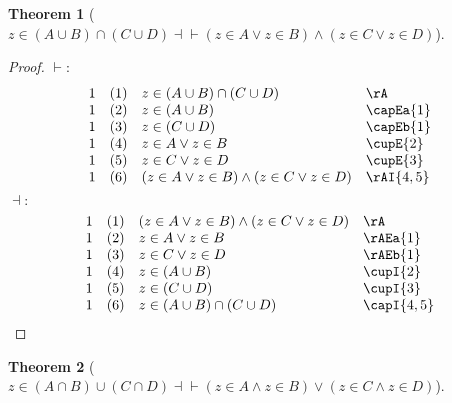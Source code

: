 \documentclass{book}
\theoremstyle{plain}
\newtheorem{theorem}{Theorem}
\theoremstyle{remark}
\theoremstyle{definition}
\begin{document}
\label{zInLpAcuBRpcaLpCcuDRpEqvLpzInAOrzInBRpAndLpzInCOrzInDRp}
\begin{theorem}[\(z \in (A\cup B)\cap (C\cup D) \dashv\vdash (z \in A\lor z\in B)\land (z\in C\lor z\in D)\)]
\end{theorem}	

\begin{proof}
	\(\vdash:\)
	\[
	\begin{array}{llll}
		1 & (1) & z \in (A\cup B)\cap (C\cup D) & \rA \\
		1 & (2) & z \in (A\cup B) & \capEa{1} \\
		1 & (3) & z \in (C\cup D) & \capEb{1} \\
		1 & (4) & z \in A\lor z\in B & \cupE{2} \\
		1 & (5) & z \in C\lor z\in D & \cupE{3} \\
		1 & (6) & (z \in A\lor z\in B) \land (z \in C\lor z\in D) & \rAI{4,5} \\
	\end{array}
	\]
	\(\dashv:\)
	\[
	\begin{array}{llll}
		1 & (1) & (z \in A\lor z\in B) \land (z \in C\lor z\in D) & \rA\\
		1 & (2) & z \in A\lor z\in B & \rAEa{1}\\
		1 & (3) & z \in C\lor z\in D & \rAEb{1}\\
		1 & (4) & z \in (A\cup B) & \cupI{2}\\
		1 & (5) & z \in (C\cup D) & \cupI{3}\\
		1 & (6) & z \in (A\cup B)\cap (C\cup D) & \capI{4,5}\\
	\end{array}
	\]
\end{proof}

\label{zInLpAcaBRpcuLpCcaDRpEqvLpzInAAndzInBRpOrLpzInCAndzInDRp}
\begin{theorem}[\(z \in (A\cap B)\cup (C\cap D) \dashv\vdash (z \in A\land z\in B)\lor (z\in C\land z\in D)\)]
\end{theorem}	
\end{document}
